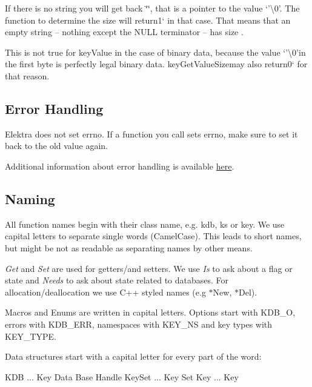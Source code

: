 If there is no string you will get back {\ttfamily \char`\"{}\char`\"{}}, that is a pointer to the value `'\textbackslash{}0'{\ttfamily . The function to determine the size will return}1` in that case. That means that an empty string – nothing except the N\+U\+L\+L terminator – has size {}.

This is not true for {\ttfamily key\+Value} in the case of binary data, because the value `'\textbackslash{}0'{\ttfamily in the first byte is perfectly legal binary data. }key\+Get\+Value\+Size{\ttfamily may also return}0` for that reason.

\subsection*{Error Handling}

Elektra does not set {\ttfamily errno}. If a function you call sets {\ttfamily errno}, make sure to set it back to the old value again.

Additional information about error handling is available \hyperlink{md_doc_help_elektra-error-handling_doc_help_elektra-error-handling_md}{here}.

\subsection*{Naming}

All function names begin with their class name, e.\+g. {\ttfamily kdb}, {\ttfamily ks} or {\ttfamily key}. We use capital letters to separate single words (Camel\+Case). This leads to short names, but might be not as readable as separating names by other means.

{\itshape Get} and {\itshape Set} are used for getters/and setters. We use {\itshape Is} to ask about a flag or state and {\itshape Needs} to ask about state related to databases. For allocation/deallocation we use C++ styled names (e.\+g {\ttfamily $\ast$\+New}, {\ttfamily $\ast$\+Del}).

Macros and Enums are written in capital letters. Options start with {\ttfamily K\+D\+B\+\_\+\+O}, errors with {\ttfamily K\+D\+B\+\_\+\+E\+R\+R}, namespaces with {\ttfamily K\+E\+Y\+\_\+\+N\+S} and key types with {\ttfamily K\+E\+Y\+\_\+\+T\+Y\+P\+E}.

Data structures start with a capital letter for every part of the word\+: \begin{DoxyVerb}    KDB ... Key Data Base Handle
    KeySet ... Key Set
    Key ... Key
\end{DoxyVerb}


